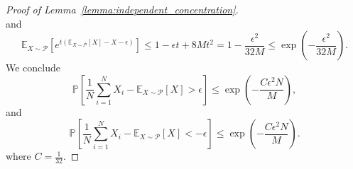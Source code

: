 \begin{proof}[Proof of Lemma~\ref{lemma:independent_concentration}]
\begin{equation*}
\end{equation*}
and
\begin{equation*}
\mathbb{E}_{X \sim \mathcal{P}}\left[e^{t\left( \mathbb{E}_{X\sim \mathcal{P}}[X]-X -\epsilon \right)}\right]  \leq 1- \epsilon t + 8Mt^2 =  1- \frac{\epsilon^2}{32 M} \leq \exp \left (-\frac{\epsilon^2}{32M} \right).
\end{equation*}
We conclude
\begin{equation*}
    \mathbb{P} \left [ \frac{1}{N} \sum_{i=1}^N X_i - \mathbb{E}_{X\sim \mathcal{P}}[X] > \epsilon \right] \leq \exp\left ( -\frac{C \epsilon^2 N}{M} \right ),
\end{equation*}
and
\begin{equation*}
    \mathbb{P} \left [ \frac{1}{N} \sum_{i=1}^N X_i - \mathbb{E}_{X\sim \mathcal{P}}[X] <- \epsilon \right] \leq \exp\left ( -\frac{C \epsilon^2 N}{M} \right ).
\end{equation*}
where $C = \frac{1}{32}$.
\end{proof}

